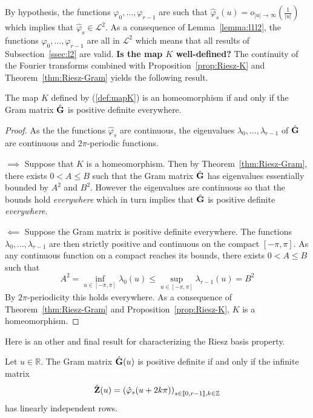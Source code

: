 By hypothesis, the functions $\varphi_{0}, \ldots, \varphi_{r-1}$ are such that $\hat{\varphi}_s(u) = o_{|u|\to 
\infty}\left(\frac{1}{|u|}\right)$ which implies that $\hat{\varphi}_s \in \mathcal{L}^2$. As a consequence of 
Lemma~\ref{lemma:l1l2}, the functions $\varphi_{0}, \ldots, \varphi_{r-1}$ are all in $\mathcal{L}^2$ which means that 
all results of Subsection~\ref{ssec:l2} are valid. \textbf{Is the map $K$ well-defined?} The continuity of the Fourier 
transforms combined with Proposition~\ref{prop:Riesz-K} and Theorem~\ref{thm:Riesz-Gram} yields the following 
result.

\begin{prop}\label{prop:K-Gram}
  The map $K$ defined by (\ref{def:mapK}) is an homeomorphism if and only if the Gram matrix $\hat{\mathbf{G}}$ is 
  positive definite everywhere.
\end{prop}

\begin{proof}
  As the the functions $\hat{\varphi}_s$ are continuous, the eigenvalues $\lambda_0, \ldots, \lambda_{r-1}$ of 
  $\hat{\mathbf{G}}$ are continuous and $2\pi$-periodic functions.  

  $\implies$ Suppose that $K$ is a homeomorphism. Then by Theorem~\ref{thm:Riesz-Gram}, there exists $0 < A \leq B$ such 
  that the Gram matrix $\hat{\mathbf{G}}$ has eigenvalues essentially bounded by $A^2$ and $B^2$. However the eigenvalues 
  are continuous so that the bounds hold \emph{everywhere} which in turn implies that $\hat{\mathbf{G}}$ is positive 
  definite \emph{everywhere}.

  $\impliedby$ Suppose the Gram matrix is positive definite everywhere. The functions $\lambda_0, \ldots, \lambda_{r-1}$ 
  are then strictly positive and continuous on the compact $[-\pi, \pi]$. As any continuous function on a compact 
  reaches its bounds, there exists $0 < A \leq B$ such that
  \begin{equation*}
    A^2 = \inf_{u \in [-\pi, \pi]} \lambda_0(u) \leq \sup_{u \in [-\pi, \pi]} \lambda_{r-1}(u) = B^2
  \end{equation*}
  By $2\pi$-periodicity this holds everywhere. As a consequence of Theorem~\ref{thm:Riesz-Gram} and 
  Proposition~\ref{prop:Riesz-K},  $K$ is a homeomorphism.
\end{proof}

Here is an other and final result for characterizing the Riesz basis property.
\begin{prop}\label{prop:Gram-H}
  Let $u \in \mathbb{R}$. The Gram matrix $\hat{\mathbf{G}}(u)$ is positive definite if and only if the infinite matrix
  \begin{equation}
    \hat{\mathbf{Z}}(u) = {\left(\hat{\varphi}_s(u+2k\pi)\right)}_{s \in \llbracket0,r-1\rrbracket, k \in \mathbb{Z}}
  \end{equation}
  has linearly independent rows.
\end{prop}

